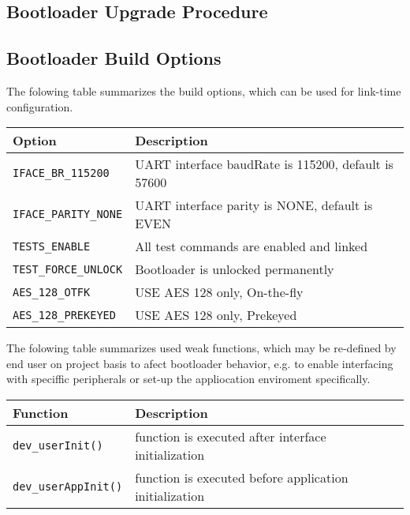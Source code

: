 \clearpage
\subsection{Bootloader Upgrade Procedure}

\clearpage
\subsection{Bootloader Build Options}

  The folowing table summarizes the build options, which can be used for link-time configuration.

  \begin{table*}[!ht]
    \hspace*{-4cm}
    \begin{tabular}{| p{5.5cm} | p{7.5cm} |}
        \hline
        \rowcolor{SeaGreen3!30!} {\bf Option} & {\bf Description} \\
        \hline
        \hline
        \texttt{IFACE\_BR\_115200} & UART interface baudRate is 115200, default is 57600\\
        \hline
        \texttt{IFACE\_PARITY\_NONE} & UART interface parity is NONE, default is EVEN\\
        \hline
        \texttt{TESTS\_ENABLE} & All test commands are enabled and linked\\
        \hline
        \texttt{TEST\_FORCE\_UNLOCK} & Bootloader is unlocked permanently \\
        \hline
        \texttt{AES\_128\_OTFK} & USE AES 128 only, On-the-fly \\
        \hline
        \texttt{AES\_128\_PREKEYED} & USE AES 128 only, Prekeyed \\
        \hline
    \end{tabular}
    \label{tab:cmdset}
   \end{table*}
   
   The folowing table summarizes used weak functions, which may be re-defined by end user on project basis to afect bootloader behavior, e.g. to enable interfacing with speciffic peripherals or set-up the appliocation enviroment specifically.
   
   \begin{table*}[!ht]
    \hspace*{-4cm}
    \begin{tabular}{| p{5.5cm} | p{7.5cm} |}
        \hline
        \rowcolor{SeaGreen3!30!} {\bf Function} & {\bf Description} \\
        \hline
        \hline
        \texttt{dev\_userInit()} & function is executed after interface initialization\\
        \hline
        \texttt{dev\_userAppInit()} & function is executed before application initialization\\
        \hline
    \end{tabular}
    \label{tab:cmdset}
   \end{table*}
   
